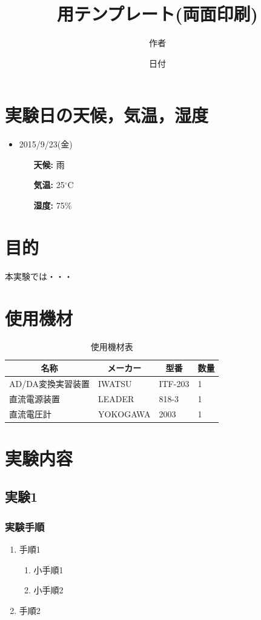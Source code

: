 \documentclass[10.5pt,twoside]{jsarticle}
\title{\LaTeXe 用テンプレート(両面印刷)}
\date{日付}
\author{作者}
\begin{document}
\maketitle
\thispagestyle{fancy}

\section{実験日の天候，気温，湿度}
\begin{itemize}
\item{2015/9/23(金)}
\begin{itemize}
\item[\textbf{天候:}]{雨}
\item[\textbf{気温:}]{25$^\circ$C}
\item[\textbf{湿度:}]{75\%}
\end{itemize}
\end{itemize}

\section{目的}
本実験では・・・

\section{使用機材}
\begin{table}[H]
\centering
\caption{使用機材表} \label{Equipments}
\begin{tabular}{|l|l|l|l|} 
\hline
\multicolumn{1}{|c|}{\textbf{名称}}&\multicolumn{1}{c|}{\textbf{メーカー}}&\multicolumn{1}{c|}{\textbf{型番}}&\multicolumn{1}{c|}{\textbf{数量}}\\\hline\hline
AD/DA変換実習装置&IWATSU&ITF-203&1\\\hline
直流電源装置&LEADER&818-3&1\\\hline
直流電圧計&YOKOGAWA&2003&1\\\hline
\end{tabular}
\end{table}

\newpage

\section{実験内容}
\subsection{実験1}
\subsubsection{実験手順}
\begin{enumerate}
\item{手順1}
	\begin{enumerate}
		\item{小手順1}
		\item{小手順2}
	\end{enumerate}
\item{手順2}
\end{enumerate}
\end{document}
